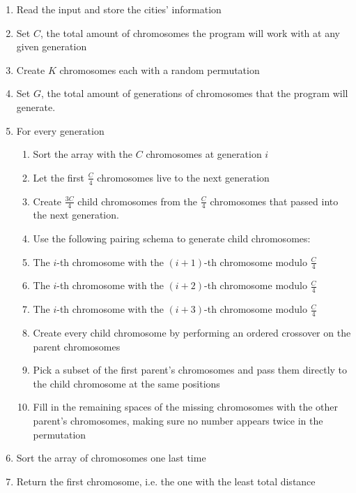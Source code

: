 \documentclass[twoside,twocolumn]{article}
\begin{document}
\begin{enumerate}
\item Read the input and store the cities’ information
\item Set $C$, the total amount of chromosomes the program will work with at any given generation
\item Create $K$ chromosomes each with a random permutation
\item Set $G$, the total amount of generations of chromosomes that the program will generate.
\item For every generation
\begin{enumerate}
\item Sort the array with the $C$ chromosomes at generation $i$
\item Let the first $\frac{C}{4}$ chromosomes live to the next generation
\item Create $\frac{3C}{4}$ child chromosomes from the $\frac{C}{4}$ chromosomes that passed into the next generation.
\item Use the following pairing schema to generate child chromosomes:
\item The $i$-th chromosome with the $(i + 1)$-th chromosome modulo $\frac{C}{4}$
\item The $i$-th chromosome with the $(i + 2)$-th chromosome modulo $\frac{C}{4}$
\item The $i$-th chromosome with the $(i + 3)$-th chromosome modulo $\frac{C}{4}$
\item Create every child chromosome by performing an ordered crossover on the parent chromosomes
\item Pick a subset of the first parent’s chromosomes and pass them directly to the child chromosome at the same positions 
\item  Fill in the remaining spaces of the missing chromosomes with the other parent’s chromosomes, making sure no number appears twice in the permutation
\end{enumerate}
\item Sort the array of chromosomes one last time
\item  Return the first chromosome, i.e. the one with the least total distance
\end{enumerate}
\end{document}
